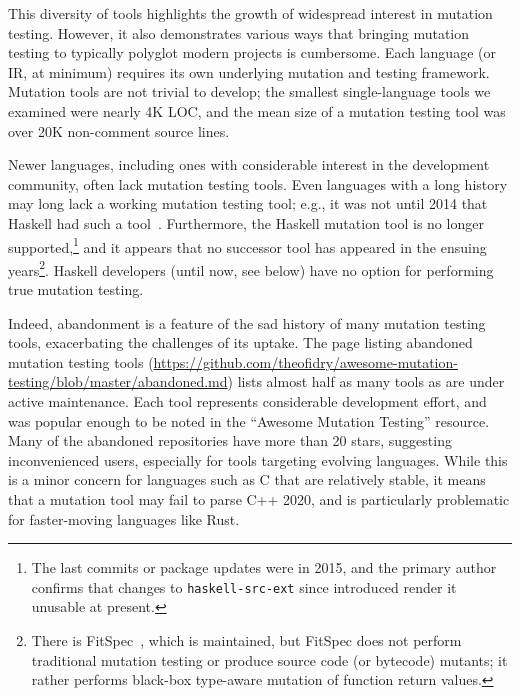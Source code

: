 \documentclass[acmsmall,screen,review,anonymous]{acmart}
\begin{document}
This diversity of tools highlights the growth of widespread interest in mutation
testing.  However, it also demonstrates various ways that bringing mutation testing to
typically polyglot modern projects is cumbersome. Each language (or IR, at
minimum) requires its own underlying mutation and testing framework.
Mutation tools are not trivial to develop; the smallest
single-language tools we examined were nearly 4K LOC, and the mean size
of a mutation testing tool was over 20K non-comment source lines.

Newer languages, including ones with considerable interest
in the development community, often lack mutation testing tools.  Even
languages with a long history may long lack a working mutation testing
tool; e.g., it was not until 2014 that Haskell had such a tool~\cite{mucheck}. 
%
Furthermore, the Haskell mutation tool is no longer
supported,\footnote{The last commits or package updates were in 2015, and the
primary author confirms that changes to {\tt haskell-src-ext} since
introduced render it unusable at present.} and it
appears that no successor tool has appeared in the ensuing
years\footnote{There is FitSpec~\cite{FitSpec}, which is maintained,
  but FitSpec does not perform traditional mutation testing or produce
  source code (or bytecode) mutants; it rather
  performs black-box type-aware mutation of function return values.}.
Haskell developers (until now, see below) have no option for
performing true mutation testing.

Indeed, abandonment is a feature of the sad history
of many mutation testing tools, exacerbating the challenges of its uptake.  The page listing abandoned
mutation testing tools
(\url{https://github.com/theofidry/awesome-mutation-testing/blob/master/abandoned.md})
lists almost half as many tools as are under active maintenance. Each tool represents 
considerable development effort, and was
popular enough to be noted in the ``Awesome
Mutation Testing'' resource. Many of the abandoned repositories have more than
20 stars, suggesting inconvenienced users, especially for tools targeting
evolving languages. While this is a minor concern for languages such as C
that are relatively stable, it means that a mutation tool may fail
to parse C++ 2020, and is particularly problematic for 
faster-moving languages like Rust.
\end{document}
